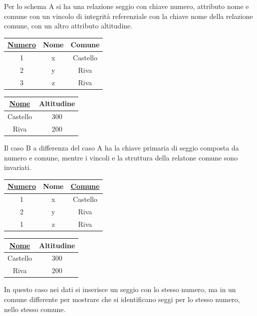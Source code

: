 \documentclass{article}
\numberwithin{equation}{subsection}
\begin{document}
Per lo schema A si ha una relazione seggio con chiave numero, attributo nome e comune con un vincolo di integrità referenziale con la chiave nome 
della relazione comune, con un altro attributo altitudine. 
\begin{center}
    \begin{tabular}{|c|c|c|}
        \hline 
        \underline{Numero} & Nome & Comune\\
        \hline
        1 & x & Castello\\
        \hline
        2 & y & Riva\\
        \hline
        3 & z & Riva\\
        \hline
    \end{tabular}
    \begin{tabular}{|c|c|}
        \hline
        \underline{Nome} & Altitudine\\
        \hline
        Castello & 300\\
        \hline
        Riva & 200\\
        \hline
    \end{tabular}
\end{center}
Il caso B a differenza del caso A ha la chiave primaria di seggio composta da numero e comune, mentre i vincoli e la struttura della relatone 
comune sono invariati. 
\begin{center}
    \begin{tabular}{|c|c|c|}
        \hline 
        \underline{Numero} & Nome & \underline{Comune}\\
        \hline
        1 & x & Castello\\
        \hline
        2 & y & Riva\\
        \hline
        1 & z & Riva\\
        \hline
    \end{tabular}
    \begin{tabular}{|c|c|}
        \hline
        \underline{Nome} & Altitudine\\
        \hline
        Castello & 300\\
        \hline
        Riva & 200\\
        \hline
    \end{tabular}
\end{center}
In questo caso nei dati si inserisce un seggio con lo stesso numero, ma in un comune differente per mostrare che si identificano seggi per lo 
stesso numero, nello stesso comune. 
\end{document}
